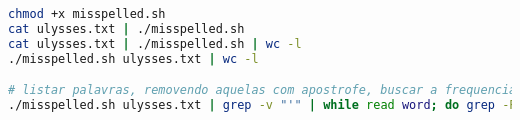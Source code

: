 \begin{frame}
\framebreak

\begin{lstlisting}[language=bash, label=lst-bash-misspelled2, caption={Listando as palavras de Ulysses não encontradas no dicionário.}, postbreak=\mbox{$\hookrightarrow$\space}, basicstyle=\fontsize{8}{10}\selectfont\ttfamily]
chmod +x misspelled.sh
cat ulysses.txt | ./misspelled.sh 
cat ulysses.txt | ./misspelled.sh | wc -l
./misspelled.sh ulysses.txt | wc -l

# listar palavras, removendo aquelas com apostrofe, buscar a frequencia de ocorrencia e ordenar
./misspelled.sh ulysses.txt | grep -v "'" | while read word; do grep -P "\s$word$" wordlist.txt; done | sort -k1nr -k2
\end{lstlisting}

\framebreak

\vspace{2ex}

\vspace{2ex}

\vspace{2ex}


\end{frame}



